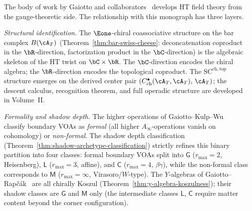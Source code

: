 \begin{remark}
\label{rem:gaiotto-programme-comparison}

The body of work by Gaiotto and
collaborators~\cite{gaiotto-rapchak,CostelloGaiotto2020,GKW2025}
develops HT field theory from the gauge-theoretic side. The
relationship with this monograph has three layers.

\emph{Structural identification.}
The $\Eone$-chiral coassociative structure on the bar complex
$B(\cA_T)$
(Theorem~\ref{thm:bar-swiss-cheese}: deconcatenation coproduct
in the $\bR$-direction, factorization product in
the $\bC$-direction) is the algebraic skeleton of the HT
twist on $\bC \times \bR$. The $\bC$-direction encodes the
chiral algebra; the $\bR$-direction encodes the topological
coproduct. The $\mathrm{SC}^{\mathrm{ch,top}}$ structure emerges on the
derived center pair $(C^\bullet_{\mathrm{ch}}(\cA_T,\cA_T),\,\cA_T)$;
the descent calculus, recognition theorem, and
full operadic structure are developed in
Volume~II\@.

\emph{Formality and shadow depth.}
The higher operations of Gaiotto--Kulp--Wu~\cite{GKW2025}
classify boundary VOAs as \emph{formal} (all higher
$A_\infty$-operations vanish on cohomology) or
\emph{non-formal}. The shadow depth classification
(Theorem~\ref{thm:shadow-archetype-classification})
strictly refines this binary partition into four classes:
formal boundary VOAs split into
$\mathsf{G}$ ($r_{\max} = 2$, Heisenberg),
$\mathsf{L}$ ($r_{\max} = 3$, affine), and
$\mathsf{C}$ ($r_{\max} = 4$, $\beta\gamma$), while
the non-formal class corresponds to
$\mathsf{M}$ ($r_{\max} = \infty$, Virasoro/$W$-type).
The $Y$-algebras of Gaiotto--Rap\v{c}\'ak~\cite{gaiotto-rapchak}
are all chirally Koszul
(Theorem~\ref{thm:y-algebra-koszulness}); their shadow
classes are $\mathsf{G}$ and $\mathsf{M}$ only (the
intermediate classes $\mathsf{L}$, $\mathsf{C}$ require
matter content beyond the corner configuration).


\end{remark}
